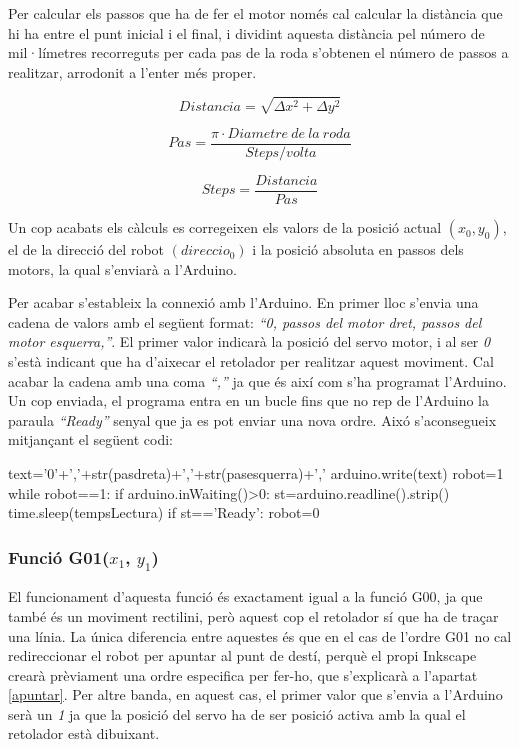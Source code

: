 Per calcular els passos que ha de fer el motor només cal calcular la distància que hi ha entre el punt inicial i el final, i dividint aquesta distància pel número de mil·límetres recorreguts per cada pas de la roda s’obtenen el número de passos a realitzar, arrodonit a l'enter més proper. 

\begin{equation}\label{eq:dist}
Distancia=\sqrt{\Delta x^2+ \Delta y^2}
\end{equation}

\begin{equation}\label{eq:pas}
Pas=\frac{\pi\cdot Diametre \ de \ la \ roda}{Steps/volta}
\end{equation}

\begin{equation}\label{eq:steps}
Steps=\frac{Distancia}{Pas}
\end{equation}


Un cop acabats els càlculs es corregeixen els valors de la posició actual $(x_{0},y_{0})$, el de la direcció del robot $(direccio_{0})$ i la posició absoluta en passos dels motors, la qual s’enviarà a l'Arduino. 

Per acabar s’estableix la connexió amb l’Arduino. En primer lloc s’envia una cadena de valors amb el següent format: \emph{“0, passos del motor dret, passos del motor esquerra,”}. El primer valor indicarà la posició del servo motor, i al ser \emph{0} s’està indicant que ha d’aixecar el retolador per realitzar aquest moviment. Cal acabar la cadena amb una coma \emph{“,”} ja que és així com s’ha programat l’Arduino. Un cop enviada, el programa entra en un bucle fins que no rep de l’Arduino la paraula \emph{“Ready”} senyal que ja es pot enviar una nova ordre. Aixó s’aconsegueix mitjançant el següent codi:

\begin{python}
	text='0'+','+str(pasdreta)+','+str(pasesquerra)+','
	arduino.write(text)
	robot=1
	while robot==1:
		if arduino.inWaiting()>0:
			st=arduino.readline().strip()
			time.sleep(tempsLectura)
		if st=='Ready':
			robot=0
\end{python}

\subsubsection{Funció G01($x_{1}$, $y_{1}$)}
El funcionament d’aquesta funció és exactament igual a la funció G00, ja que també és un moviment rectilini, però aquest cop el retolador sí que ha de traçar una línia. La única diferencia entre aquestes és que en el cas de l’ordre G01 no cal redireccionar el robot per apuntar al punt de destí, perquè el propi Inkscape crearà prèviament una ordre especifica per fer-ho, que s’explicarà a l’apartat \ref{apuntar}. Per altre banda, en aquest cas, el primer valor que s’envia a l’Arduino serà un \emph{1} ja que la posició del servo ha de ser posició activa amb la qual el retolador està dibuixant. 

